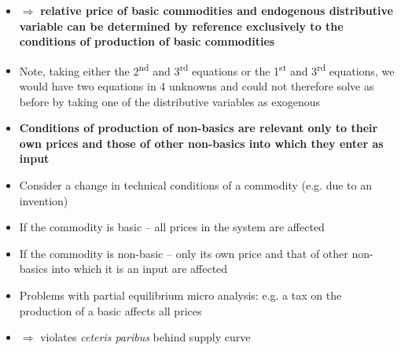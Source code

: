 \documentclass[a4paper,twoside]{article}
\numberwithin{equation}{section}
\numberwithin{figure}{section}
\begin{document}
\begin{itemize}
		\item \( \Rightarrow \) \textbf{relative price of basic commodities and endogenous distributive variable can be determined by reference exclusively to the conditions of production of basic commodities}
		\item Note, taking either the 2\textsuperscript{nd} and 3\textsuperscript{rd} equations or the 1\textsuperscript{st} and 3\textsuperscript{rd} equations, we would have two equations in 4 unknowns and could not therefore solve as before by taking  one of the distributive variables as exogenous
		\item \textbf{Conditions of production of non-basics are relevant only to their own prices and those of other non-basics into which they enter as input}
		\item Consider a change in technical conditions of a commodity (e.g. due to an invention)
		\item If the commodity is basic -- all prices in the system are affected
		\item If the commodity is non-basic -- only its own price and that of other non-basics into which it is an input are affected
		\item Problems with partial equilibrium micro analysis: e.g. a tax on the production of a basic affects all prices
		\item \( \Rightarrow \) violates \textit{ceteris paribus} behind supply curve
	\end{itemize}
\end{document}
